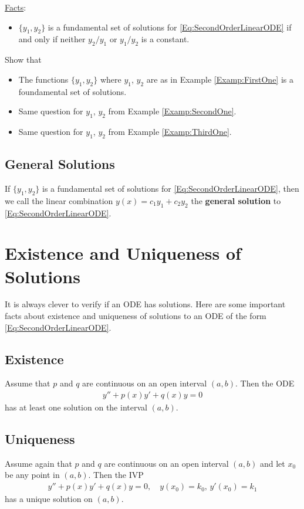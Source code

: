 \documentclass[12pt,a4paper]{article}
\newcounter{example}[section]
\begin{document}
	\underline{Facts}:
		\begin{itemize}
		\item $\{ y_1 , y_2 \}$ is a fundamental set of solutions for \eqref{Eq:SecondOrderLinearODE} if and only if neither $y_2/y_1$ or $y_1/y_2$ is a constant.
		\end{itemize}
		
	\begin{example}
	Show that
		\begin{itemize}
		\item The functions $\{ y_1 , y_2 \}$ where $y_1$, $y_2$ are as in Example \ref{Examp:FirstOne} is a foundamental set of solutions.
		\item Same question for $y_1$, $y_2$ from Example \ref{Examp:SecondOne}.
		\item Same question for $y_1$, $y_2$ from Example \ref{Examp:ThirdOne}.
		\end{itemize}
	\end{example}
	
	\vfill
	
\subsection{General Solutions}
If $\{ y_1 , y_2 \}$ is a fundamental set of solutions for \eqref{Eq:SecondOrderLinearODE}, then we call the linear combination $y (x) = c_1 y_1 + c_2 y_2$ the \textbf{general solution} to \eqref{Eq:SecondOrderLinearODE}.
	
\newpage

\section{Existence and Uniqueness of Solutions}

It is always clever to verify if an ODE has solutions. Here are some important facts about existence and uniqueness of solutions to an ODE of the form \eqref{Eq:SecondOrderLinearODE}.

	\subsection{Existence}
	Assume that $p$ and $q$ are continuous on an open interval $(a, b)$. Then the ODE
		\begin{align*}
		y'' + p(x) y' + q(x) y = 0
		\end{align*}
	has at least one solution on the interval $(a, b)$.
	
	\subsection{Uniqueness}
	Assume again that $p$ and $q$ are continuous on an open interval $(a, b)$ and let $x_0$ be any point in $(a, b)$. Then the IVP
		\begin{align*}
		y'' + p(x) y' + q(x) y = 0 , \quad y(x_0) = k_0 , \, y'(x_0) = k_1
		\end{align*}
	has a unique solution on $(a, b)$.
\end{document}
